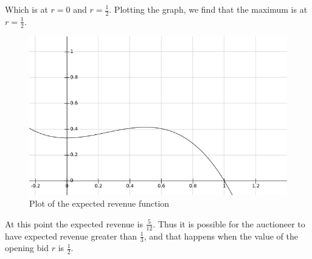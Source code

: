 \documentclass[11pt,journal]{article}
\begin{document}
	Which is at $r=0$ and $r = \frac{1}{2}$. Plotting the graph, we find that the maximum is at $r=\frac{1}{2}$. 
	
	\begin{figure}[h]
		\centering
		\includegraphics[scale=0.7]{save.png}
		\caption{Plot of the expected revenue function}
	\end{figure}
	
	At this point the expected revenue is $\frac{5}{12}$. Thus it is possible for the auctioneer to have expected revenue greater than $\frac{1}{3}$, and that happens when the value of the opening bid $r$ is $ \frac{1}{2} $.
	

	
	
\end{document}
